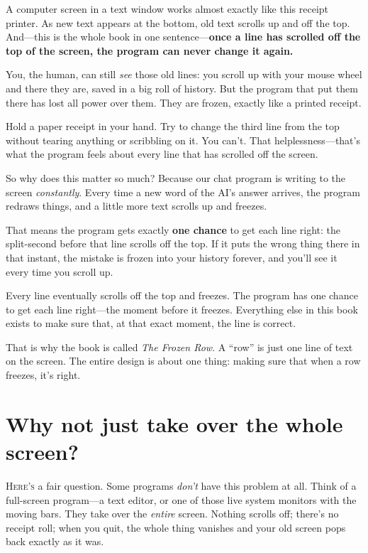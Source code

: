 \documentclass[11pt,twoside]{book}
\begin{document}
A computer screen in a text window works almost exactly like this receipt
printer. As new text appears at the bottom, old text scrolls up and off the
top. And---this is the whole book in one sentence---\textbf{once a line has
scrolled off the top of the screen, the program can never change it again.}

You, the human, can still \emph{see} those old lines: you scroll up with
your mouse wheel and there they are, saved in a big roll of history. But the
program that put them there has lost all power over them. They are frozen,
exactly like a printed receipt.

\begin{pic}
Hold a paper receipt in your hand. Try to change the third line from the
top without tearing anything or scribbling on it. You can't. That
helplessness---that's what the program feels about every line that has
scrolled off the screen.
\end{pic}

So why does this matter so much? Because our chat program is writing to the
screen \emph{constantly}. Every time a new word of the AI's answer arrives,
the program redraws things, and a little more text scrolls up and freezes.

That means the program gets exactly \textbf{one chance} to get each line
right: the split-second before that line scrolls off the top. If it puts the
wrong thing there in that instant, the mistake is frozen into your history
forever, and you'll see it every time you scroll up.

\begin{insight}
Every line eventually scrolls off the top and freezes. The program has one
chance to get each line right---the moment before it freezes. Everything
else in this book exists to make sure that, at that exact moment, the line
is correct.
\end{insight}

That is why the book is called \emph{The Frozen Row}. A ``row'' is just one
line of text on the screen. The entire design is about one thing: making
sure that when a row freezes, it's right.

\chapter{Why not just take over the whole screen?}
\lettrine{H}{ere's} a fair question. Some programs \emph{don't} have this
problem at all. Think of a full-screen program---a text editor, or one of
those live system monitors with the moving bars. They take over the
\emph{entire} screen. Nothing scrolls off; there's no receipt roll; when you
quit, the whole thing vanishes and your old screen pops back exactly as it
was.
\end{document}
